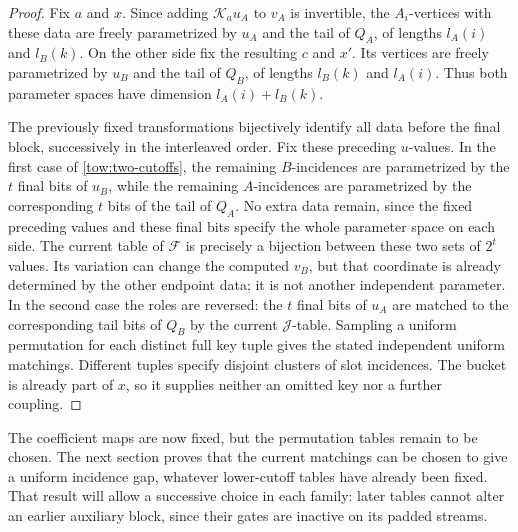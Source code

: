 \begin{proof}
Fix \(a\) and \(x\).  Since adding \(\mathcal K_au_A\) to
\(v_A\) is invertible, the \(A_i\)-vertices with these data are
freely parametrized by \(u_A\) and the tail of \(Q_A\), of lengths
\(l_A(i)\) and \(l_B(k)\).  On the other side fix the resulting
\(c\) and \(x'\).  Its vertices are freely parametrized by
\(u_B\) and the tail of \(Q_B\), of lengths \(l_B(k)\) and
\(l_A(i)\).  Thus both parameter spaces have dimension
\(l_A(i)+l_B(k)\).

The previously fixed transformations bijectively identify all data
before the final block, successively in the interleaved order.
Fix these preceding \(u\)-values.  In the first case of
\eqref{tow:two-cutoffs}, the remaining \(B\)-incidences are
parametrized by the \(t\) final bits of \(u_B\), while the remaining
\(A\)-incidences are parametrized by the corresponding \(t\) bits
of the tail of \(Q_A\).  No extra data remain, since the fixed
preceding values and these final bits specify the whole parameter
space on each side.  The current table of \(\mathcal F\) is
precisely a bijection between these two sets of \(2^t\) values.
Its variation can change the computed \(v_B\), but that coordinate
is already determined by the other endpoint data; it is not another
independent parameter.  In the second case the roles are reversed:
the \(t\) final bits of \(u_A\) are matched to the corresponding
tail bits of \(Q_B\) by the current \(\mathcal J\)-table.
Sampling a uniform permutation for each distinct full key tuple gives
the stated independent uniform matchings.  Different tuples specify
disjoint clusters of slot incidences.  The bucket is already part of
\(x\), so it supplies neither an omitted key nor a further coupling.
\end{proof}

The coefficient maps are now fixed, but the permutation tables remain to
be chosen.  The next section proves that the current matchings can be
chosen to give a uniform incidence gap, whatever lower-cutoff tables have
already been fixed.  That result will allow a successive choice in each
family: later tables cannot alter an earlier auxiliary block, since their
gates are inactive on its padded streams.
